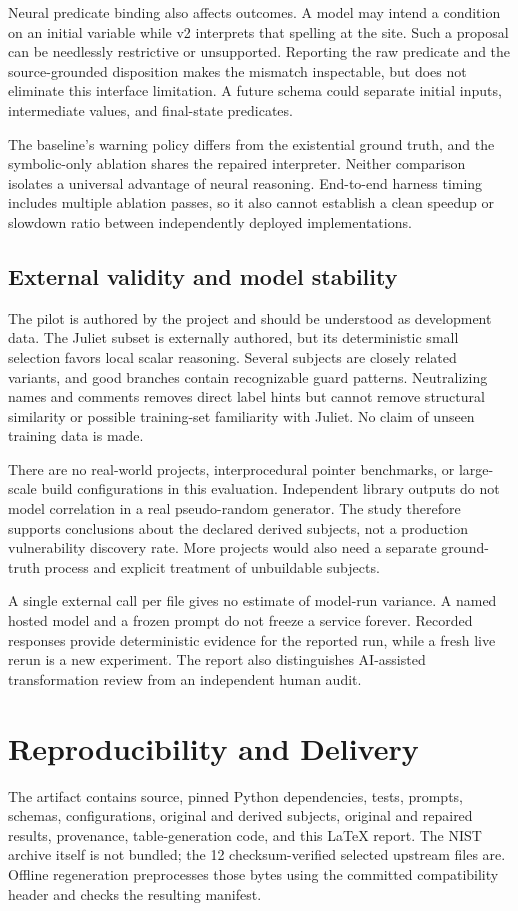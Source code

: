 \documentclass[sigconf]{acmart}
\begin{document}
Neural predicate binding also affects outcomes. A model may intend a condition
on an initial variable while v2 interprets that spelling at the site. Such a
proposal can be needlessly restrictive or unsupported. Reporting the raw
predicate and the source-grounded disposition makes the mismatch inspectable,
but does not eliminate this interface limitation. A future schema could
separate initial inputs, intermediate values, and final-state predicates.

The baseline's warning policy differs from the existential ground truth, and
the symbolic-only ablation shares the repaired interpreter. Neither comparison
isolates a universal advantage of neural reasoning. End-to-end harness timing
includes multiple ablation passes, so it also cannot establish a clean
speedup or slowdown ratio between independently deployed implementations.

\subsection{External validity and model stability}
The pilot is authored by the project and should be understood as development
data. The Juliet subset is externally authored, but its deterministic small
selection favors local scalar reasoning. Several subjects are closely related
variants, and good branches contain recognizable guard patterns. Neutralizing
names and comments removes direct label hints but cannot remove structural
similarity or possible training-set familiarity with Juliet. No claim of
unseen training data is made.

There are no real-world projects, interprocedural pointer benchmarks, or
large-scale build configurations in this evaluation. Independent library
outputs do not model correlation in a real pseudo-random generator. The study
therefore supports conclusions about the declared derived subjects, not a
production vulnerability discovery rate. More projects would also need a
separate ground-truth process and explicit treatment of unbuildable subjects.

A single external call per file gives no estimate of model-run variance. A
named hosted model and a frozen prompt do not freeze a service forever.
Recorded responses provide deterministic evidence for the reported run, while
a fresh live rerun is a new experiment. The report also distinguishes
AI-assisted transformation review from an independent human audit.

\section{Reproducibility and Delivery}
The artifact contains source, pinned Python dependencies, tests, prompts,
schemas, configurations, original and derived subjects, original and repaired
results, provenance, table-generation code, and this LaTeX report. The NIST
archive itself is not bundled; the 12 checksum-verified selected upstream
files are. Offline regeneration preprocesses those bytes using the committed
compatibility header and checks the resulting manifest.
\end{document}
